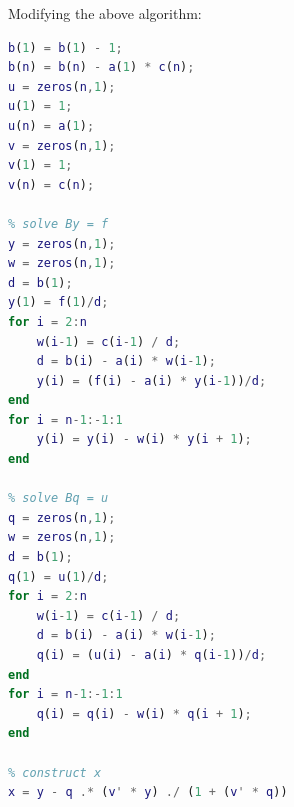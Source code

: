 \documentclass{article}
\begin{document}
Modifying the above algorithm:
\begin{lstlisting}[language=Matlab]
% modify tridiagonal array and construct u and v
b(1) = b(1) - 1;
b(n) = b(n) - a(1) * c(n);
u = zeros(n,1);
u(1) = 1;
u(n) = a(1);
v = zeros(n,1);
v(1) = 1;
v(n) = c(n);

% solve By = f
y = zeros(n,1);
w = zeros(n,1);
d = b(1);
y(1) = f(1)/d;
for i = 2:n
    w(i-1) = c(i-1) / d;
    d = b(i) - a(i) * w(i-1);
    y(i) = (f(i) - a(i) * y(i-1))/d;
end
for i = n-1:-1:1
    y(i) = y(i) - w(i) * y(i + 1);
end

% solve Bq = u
q = zeros(n,1);
w = zeros(n,1);
d = b(1);
q(1) = u(1)/d;
for i = 2:n
    w(i-1) = c(i-1) / d;
    d = b(i) - a(i) * w(i-1);
    q(i) = (u(i) - a(i) * q(i-1))/d;
end
for i = n-1:-1:1
    q(i) = q(i) - w(i) * q(i + 1);
end

% construct x
x = y - q .* (v' * y) ./ (1 + (v' * q))
\end{lstlisting}
\end{document}
